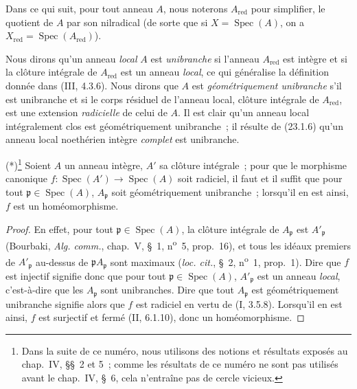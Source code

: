 \begin{env}[23.2.1]
\label{0.23.2.1-fr}
Dans ce qui suit, pour tout anneau $A$, nous noterons $A_{\mathrm{red}}$ pour
simplifier, le quotient de $A$ par son nilradical (de sorte que si
$X=\operatorname{Spec}(A)$, on a
$X_{\mathrm{red}}=\operatorname{Spec}(A_{\mathrm{red}})$).

Nous dirons qu'un anneau \emph{local} $A$ est \emph{unibranche} si l'anneau
$A_{\mathrm{red}}$ est intègre et si la clôture intégrale de
$A_{\mathrm{red}}$ est un anneau \emph{local}, ce qui généralise la définition
donnée dans (III, 4.3.6). Nous dirons que $A$ est \emph{géométriquement
unibranche} s'il est unibranche et si le corps résiduel de l'anneau local,
clôture intégrale de $A_{\mathrm{red}}$, est une extension \emph{radicielle}
de celui de $A$. Il est clair qu'un anneau local intégralement clos est
géométriquement unibranche~; il résulte de (23.1.6) qu'un anneau local
noethérien intègre \emph{complet} est unibranche.
\end{env}

\begin{lemma}[23.2.2]
\label{0.23.2.2-fr}
\textnormal{(*)}\footnote{Dans la suite de ce numéro, nous utilisons des
notions et résultats exposés au chap.~IV, §§~2 et 5~; comme les résultats de
ce numéro ne sont pas utilisés avant le chap.~IV, §~6, cela n'entraîne pas de
cercle vicieux.} Soient $A$ un anneau intègre, $A'$ sa clôture intégrale~; pour
que le morphisme canonique
$f:\operatorname{Spec}(A')\to\operatorname{Spec}(A)$ soit radiciel, il faut et
il suffit que pour tout $\mathfrak p\in\operatorname{Spec}(A)$,
$A_{\mathfrak p}$ soit géométriquement unibranche~; lorsqu'il en est ainsi,
$f$ est un homéomorphisme.
\end{lemma}

\begin{proof}
En effet, pour tout $\mathfrak p\in\operatorname{Spec}(A)$, la clôture
intégrale de $A_{\mathfrak p}$ est $A'_{\mathfrak p}$ (Bourbaki,
\emph{Alg. comm.}, chap.~V, §~1, n\textsuperscript{o}~5, prop.~16), et tous
les idéaux premiers de $A'_{\mathfrak p}$ au-dessus de
$\mathfrak pA_{\mathfrak p}$ sont maximaux (\emph{loc. cit.}, §~2,
n\textsuperscript{o}~1, prop.~1). Dire que $f$ est injectif signifie donc que
pour tout $\mathfrak p\in\operatorname{Spec}(A)$, $A'_{\mathfrak p}$ est un
anneau \emph{local}, c'est-à-dire que les $A_{\mathfrak p}$ sont
unibranches. Dire que tout $A_{\mathfrak p}$ est géométriquement unibranche
signifie alors que $f$ est radiciel en vertu de (I, 3.5.8). Lorsqu'il en est
ainsi, $f$ est surjectif et fermé (II, 6.1.10), donc un homéomorphisme.
\end{proof}

